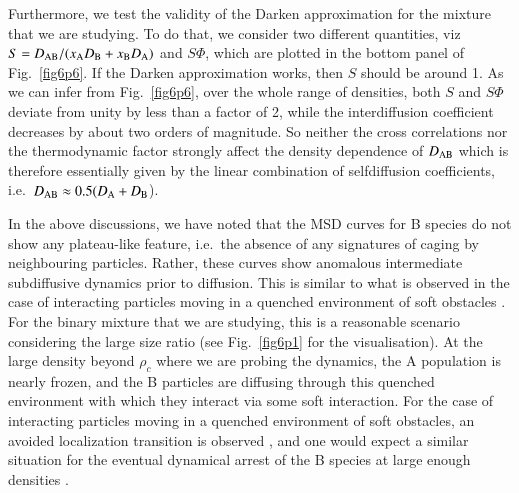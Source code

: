 Furthermore, we test the validity of the Darken approximation for the mixture that we are studying. To do that, we consider two different quantities, viz $S=D_{\rm AB}/(x_{\rm A} D_{\rm B} + x_{\rm B} D_{\rm A})$ and $S\Phi$, which are plotted in the bottom panel of Fig.~\ref{fig6p6}. If the Darken approximation works, then $S$ should be around 1. As we can infer from Fig.~\ref{fig6p6}, over the whole range of densities, both $S$ and $S \Phi$ deviate from unity by less than a factor of 2, while the interdiffusion coefficient decreases by about two orders of magnitude.  So neither the cross correlations nor the thermodynamic factor strongly affect the density dependence of $D_{\rm AB}$ which is therefore essentially given by the linear combination of selfdiffusion coefficients, i.e.~$D_{\rm AB} \approx 0.5 (D_{\rm A} + D_{\rm B}$).


In the above discussions, we have noted that the MSD curves for B species do not show any plateau-like feature, i.e.~the absence of any signatures of caging by neighbouring particles. Rather, these curves show anomalous intermediate subdiffusive dynamics prior to diffusion. This is similar to what is observed in the case of interacting particles moving in a quenched environment of soft obstacles \cite{schnyder2018, schnyder2015}. For the binary mixture that we are studying, this is a reasonable scenario considering the large size ratio (see Fig.~\ref{fig6p1} for the visualisation). At the large density beyond $\rho_c$ where we are probing the dynamics, the A population is nearly frozen, and the B particles are diffusing through this quenched environment with which they interact via some soft interaction. For the case of interacting particles moving in a quenched environment of soft obstacles, an avoided localization transition is observed \cite{schnyder2018}, and one would expect a similar situation for the eventual dynamical arrest of the B species at large enough densities \cite{horbach2009}.


